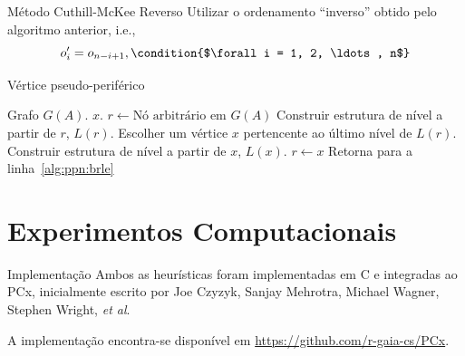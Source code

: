 \documentclass[10pt]{beamer}
\begin{document}
\begin{frame}[fragile]{Método Cuthill-McKee Reverso}
  Utilizar o ordenamento ``inverso'' obtido pelo algoritmo anterior, i.e.,
  \begin{dmath*}
    o_i' = o_{n - i + 1}, \condition{$\forall i = 1, 2, \ldots, n$}
  \end{dmath*}
\end{frame}

\begin{frame}[fragile]{Vértice pseudo-periférico}
  \begin{algorithmic}[1]
      \REQUIRE Grafo $G(A)$.
      \ENSURE $x$.
      \STATE $r \longleftarrow \text{Nó arbitrário em }G(A)$
      \STATE Construir estrutura de nível a partir de $r$, $L(r)$.
      \label{alg:ppn:brle}
      \STATE Escolher um vértice $x$ pertencente ao último nível de
      $L(r)$.
      \STATE Construir estrutura de nível a partir de $x$, $L(x)$.
          \STATE $r \longleftarrow x$
          \STATE Retorna para a linha~\ref{alg:ppn:brle}
      \ENDIF
  \end{algorithmic}
\end{frame}

\section{Experimentos Computacionais}
\begin{frame}{Implementação}
  Ambos as heurísticas foram implementadas em C e integradas ao PCx,
  inicialmente escrito por Joe Czyzyk, Sanjay Mehrotra, Michael Wagner, Stephen
  Wright, \textit{et al}.

  A implementação encontra-se disponível em
  \url{https://github.com/r-gaia-cs/PCx}.
\end{frame}
\end{document}
